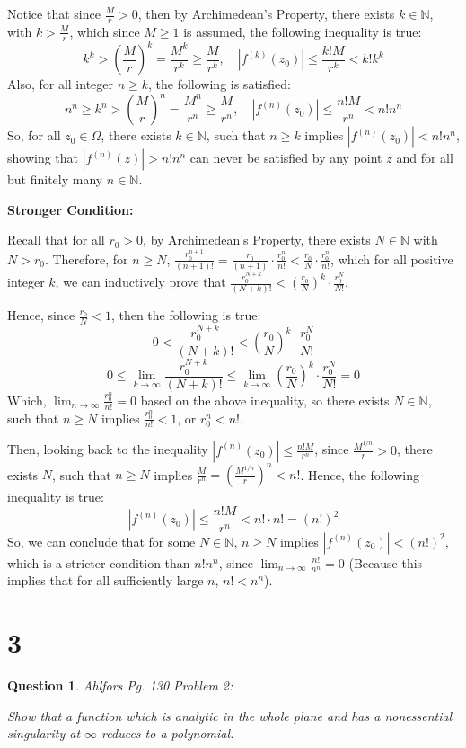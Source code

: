 \documentclass{article}
\newtheorem{question}{Question}
\begin{document}
Notice that since $\frac{M}{r}>0$, then by Archimedean's Property, there exists $k\in\mathbb{N}$, with $k> \frac{M}{r}$,
which since $M\geq 1$ is assumed, the following inequality is true:
$$k^k > \left(\frac{M}{r}\right)^k = \frac{M^k}{r^k} \geq \frac{M}{r^k},\quad |f^{(k)}(z_0)| \leq \frac{k!M}{r^k} < k!k^k$$
Also, for all integer $n\geq k$, the following is satisfied:
$$n^n \geq k^n > \left(\frac{M}{r}\right)^n = \frac{M^n}{r^n} \geq \frac{M}{r^n},\quad |f^{(n)}(z_0)| \leq \frac{n!M}{r^n} < n!n^n$$
So, for all $z_0\in\Omega$, there exists $k\in\mathbb{N}$, such that $n\geq k$ implies $|f^{(n)}(z_0)| < n!n^n$, showing that $|f^{(n)}(z)| > n!n^n$ can never be satisfied by any point $z$ and for all but finitely many $n\in\mathbb{N}$.

\hfill

\textbf{Stronger Condition:}

Recall that for all $r_0>0$, by Archimedean's Property, there exists $N\in\mathbb{N}$ with $N>r_0$. Therefore, for $n\geq N$,
$\frac{r_0^{n+1}}{(n+1)!}  = \frac{r_0}{(n+1)}\cdot \frac{r_0^n}{n!} < \frac{r_0}{N}\cdot \frac{r_0^n}{n!}$, which for all positive integer $k$, we can inductively prove that
$\frac{r_0^{N+k}}{(N+k)!} < \left(\frac{r_0}{N}\right)^k\cdot\frac{r_0^N}{N!}$. 

Hence, since $\frac{r_0}{N}<1$, then the following is true:
$$0 < \frac{r_0^{N+k}}{(N+k)!} < \left(\frac{r_0}{N}\right)^k\cdot \frac{r_0^N}{N!}$$
$$0 \leq \lim_{k\rightarrow \infty} \frac{r_0^{N+k}}{(N+k)!} \leq \lim_{k\rightarrow \infty} \left(\frac{r_0}{N}\right)^k\cdot \frac{r_0^N}{N!} = 0$$
Which, $\lim_{n\rightarrow \infty}\frac{r_0^n}{n!} = 0$ based on the above inequality, so there exists $N\in\mathbb{N}$, such that $n\geq N$ implies $\frac{r_0^n}{n!} <1$, or $r_0^n < n!$.

Then, looking back to the inequality $|f^{(n)}(z_0)| \leq \frac{n!M}{r^n}$, since $\frac{M^{1/n}}{r}>0$, there exists $N$, such that $n\geq N$ implies $\frac{M}{r^n}=\left(\frac{M^{1/n}}{r}\right)^n < n!$. Hence, the following inequality is true:
$$|f^{(n)}(z_0)| \leq \frac{n!M}{r^n}  < n!\cdot n! = (n!)^2$$
So, we can conclude that for some $N\in\mathbb{N}$, $n\geq N$ implies $|f^{(n)}(z_0)| < (n!)^2$,
which is a stricter condition than $n!n^n$, since $\lim_{n\rightarrow\infty}\frac{n!}{n^n}=0$ (Because this implies that for all sufficiently large $n$, $n!<n^n$).

\hfill

\hfill

\section*{3}
\begin{myBox}[]{}
    \begin{question}
        Ahlfors Pg. 130 Problem 2:

        Show that a function which is analytic in the whole plane and has
        a nonessential singularity at $\infty$ reduces to a polynomial.
    \end{question}
\end{myBox}
\end{document}
